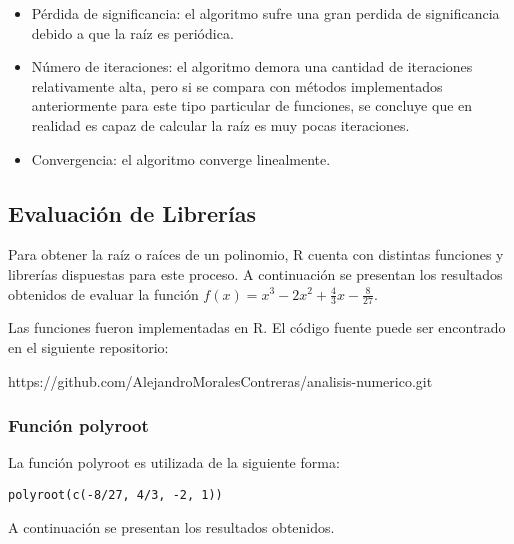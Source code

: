 \documentclass[a4paper,12pt]{article}
\begin{document}
\vspace{-1em}
\begin{itemize}
    \item Pérdida de significancia: el algoritmo sufre una gran perdida de significancia debido a que la raíz es periódica.
    \vspace{-10pt}
    \item Número de iteraciones: el algoritmo demora una cantidad de iteraciones relativamente alta, pero si se compara con métodos implementados anteriormente para este tipo particular de funciones, se concluye que en realidad es capaz de calcular la raíz es muy pocas iteraciones.
    \vspace{-10pt}
    \item Convergencia: el algoritmo converge linealmente.
\end{itemize}

\newpage

\subsection{Evaluación de Librerías}

Para obtener la raíz o raíces de un polinomio, R cuenta con distintas funciones y librerías dispuestas para este proceso. A continuación se presentan los resultados obtenidos de evaluar la función $f(x)=x^3-2x^2+\frac{4}{3}x-\frac{8}{27}$. \par 

Las funciones fueron implementadas en R. El código fuente puede ser encontrado en el siguiente repositorio: \par

\vspace{1em}
https://github.com/AlejandroMoralesContreras/analisis-numerico.git \par

\subsubsection{Función polyroot}

La función polyroot es utilizada de la siguiente forma: \par

\begin{verbatim}
polyroot(c(-8/27, 4/3, -2, 1))
\end{verbatim}

A continuación se presentan los resultados obtenidos. \par
\end{document}
